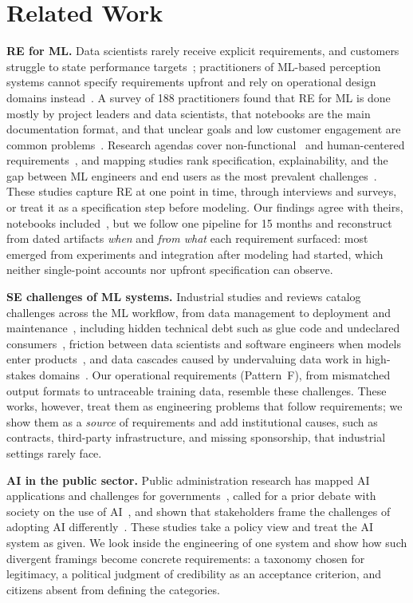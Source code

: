\documentclass[sigconf,nonacm]{acmart}
\begin{document}
\section{Related Work}
\label{sec:related}

\textbf{RE for ML.} Data scientists rarely receive explicit requirements, and customers struggle to state performance targets~\cite{vogelsang2019}; practitioners of ML-based perception systems cannot specify requirements upfront and rely on operational design domains instead~\cite{habibullah2023,habibullah2024}. A survey of 188 practitioners found that RE for ML is done mostly by project leaders and data scientists, that notebooks are the main documentation format, and that unclear goals and low customer engagement are common problems~\cite{alves2023}. Research agendas cover non-functional~\cite{horkoff2019} and human-centered requirements~\cite{ahmad2023}, and mapping studies rank specification, explainability, and the gap between ML engineers and end users as the most prevalent challenges~\cite{villamizar2021,habiba2024}.  These studies capture RE at one point in time, through interviews and surveys, or treat it as a specification step before modeling. Our findings agree with theirs, notebooks included~\cite{alves2023}, but we follow one pipeline for 15 months and reconstruct from dated artifacts \emph{when} and \emph{from what} each requirement surfaced: most emerged from experiments and integration after modeling had started, which neither single-point accounts nor upfront specification can observe.

\textbf{SE challenges of ML systems.} Industrial studies and reviews catalog challenges across the ML workflow, from data management to deployment and maintenance~\cite{amershi2019,lwakatare2019,lwakatare2020,paleyes2022}, including hidden technical debt such as glue code and undeclared consumers~\cite{sculley2015}, friction between data scientists and software engineers when models enter products~\cite{nahar2022}, and data cascades caused by undervaluing data work in high-stakes domains~\cite{sambasivan2021}. Our operational requirements (Pattern~F), from mismatched output formats to untraceable training data, resemble these challenges. These works, however, treat them as engineering problems that follow requirements; we show them as a \emph{source} of requirements and add institutional causes, such as contracts, third-party infrastructure, and missing sponsorship, that industrial settings rarely face.

\textbf{AI in the public sector.} Public administration research has mapped AI applications and challenges for governments~\cite{wirtz2019,desousa2019}, called for a prior debate with society on the use of AI~\cite{desousa2019}, and shown that stakeholders frame the challenges of adopting AI differently~\cite{sun2019}. These studies take a policy view and treat the AI system as given. We look inside the engineering of one system and show how such divergent framings become concrete requirements: a taxonomy chosen for legitimacy, a political judgment of credibility as an acceptance criterion, and citizens absent from defining the categories.
\end{document}
